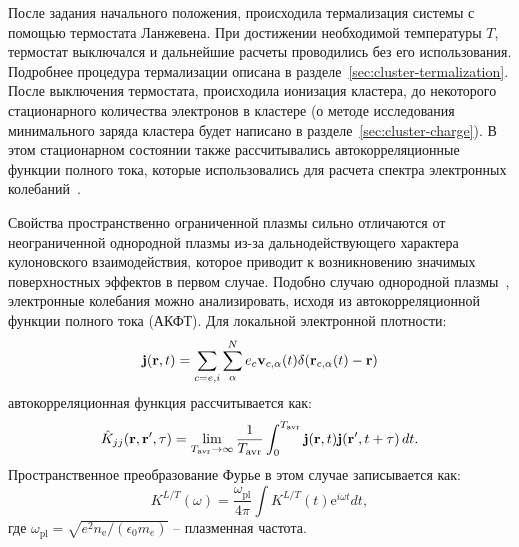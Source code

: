 После задания начального положения, происходила термализация системы с помощью термостата Ланжевена. При достижении необходимой температуры $T$, термостат выключался и дальнейшие расчеты проводились без его использования. Подробнее процедура термализации описана в разделе~\ref{sec:cluster-termalization}. После выключения термостата, происходила ионизация кластера, до некоторого стационарного количества электронов в кластере (о методе исследования минимального заряда кластера будет написано в разделе~\ref{sec:cluster-charge}). В этом стационарном состоянии также рассчитывались автокорреляционные функции полного тока, которые использовались для расчета спектра электронных колебаний~\cite{RRRM-IJMPB08,Winkel-CPP13,Broda_CPP13}.

Свойства пространственно ограниченной плазмы сильно отличаются от неограниченной однородной плазмы из-за дальнодействующего характера кулоновского взаимодействия, которое приводит к возникновению значимых поверхностных эффектов в первом случае. Подобно случаю однородной плазмы~\cite{Selchow-PRE01}, электронные колебания можно анализировать, исходя из автокорреляционной функции полного тока (АКФТ).
Для локальной электронной плотности: 
\begin{equation}
	{\bf j}({\bf r},t)=\sum_{c=e,i}\sum_{\alpha}^N e_c{\bf v}_{c,\alpha}(t)
	\delta({\bf r}_{c,\alpha}(t)-{\bf r})
\end{equation}
автокорреляционная функция рассчитывается как:
\begin{equation}
\hat K_{jj}({\bf r},{\bf r}',\tau)=\lim_{T_\mathrm{avr} \to \infty} \frac{1}{T_\mathrm{avr}} \int_0^{T_\mathrm{avr}}  {\bf j}({\bf r},t){\bf j}({\bf r}',t+\tau)\, dt.
\end{equation}
Пространственное преобразование Фурье в этом случае записывается как:
\begin{equation}\label{current-acf}
K^{L/T}(\omega) = \frac{\omega^{}_\mathrm{pl}}{4\pi} \int K^{L/T}(t) \mathrm{e}^{i\omega t} dt,
\end{equation}
где $\omega^{}_\mathrm{pl} = \sqrt{e^2 n_\mathrm{e}/(\epsilon_0 m_e)}$ -- плазменная частота.

